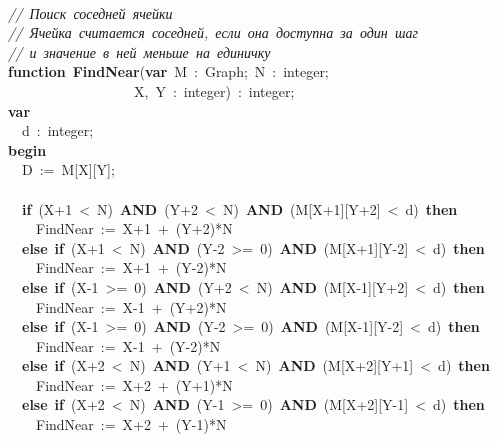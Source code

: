 \mbox{} \\
\mbox{}\textit{//\ Поиск\ соседней\ ячейки} \\
\mbox{}\textit{//\ Ячейка\ считается\ соседней,\ если\ она\ доступна\ за\ один\ шаг} \\
\mbox{}\textit{//\ и\ значение\ в\ ней\ меньше\ на\ единичку} \\
\mbox{}\textbf{function}\ \textbf{FindNear}(\textbf{var}\ M\ :\ Graph;\ N\ :\ integer; \\
\mbox{}\ \ \ \ \ \ \ \ \ \ \ \ \ \ \ \ \ \ X,\ Y\ :\ integer)\ :\ integer; \\
\mbox{}\textbf{var} \\
\mbox{}\ \ d\ :\ integer; \\
\mbox{}\textbf{begin} \\
\mbox{}\ \ D\ :=\ M[X][Y]; \\
\mbox{} \\
\mbox{}\ \ \textbf{if}\ (X+1\ \textless{}\ N)\ \textbf{AND}\ (Y+2\ \textless{}\ N)\ \textbf{AND}\ (M[X+1][Y+2]\ \textless{}\ d)\ \textbf{then} \\
\mbox{}\ \ \ \ FindNear\ :=\ X+1\ +\ (Y+2)*N \\
\mbox{}\ \ \textbf{else}\ \textbf{if}\ (X+1\ \textless{}\ N)\ \textbf{AND}\ (Y-2\ \textgreater{}=\ 0)\ \textbf{AND}\ (M[X+1][Y-2]\ \textless{}\ d)\ \textbf{then} \\
\mbox{}\ \ \ \ FindNear\ :=\ X+1\ +\ (Y-2)*N \\
\mbox{}\ \ \textbf{else}\ \textbf{if}\ (X-1\ \textgreater{}=\ 0)\ \textbf{AND}\ (Y+2\ \textless{}\ N)\ \textbf{AND}\ (M[X-1][Y+2]\ \textless{}\ d)\ \textbf{then} \\
\mbox{}\ \ \ \ FindNear\ :=\ X-1\ +\ (Y+2)*N \\
\mbox{}\ \ \textbf{else}\ \textbf{if}\ (X-1\ \textgreater{}=\ 0)\ \textbf{AND}\ (Y-2\ \textgreater{}=\ 0)\ \textbf{AND}\ (M[X-1][Y-2]\ \textless{}\ d)\ \textbf{then} \\
\mbox{}\ \ \ \ FindNear\ :=\ X-1\ +\ (Y-2)*N \\
\mbox{}\ \ \textbf{else}\ \textbf{if}\ (X+2\ \textless{}\ N)\ \textbf{AND}\ (Y+1\ \textless{}\ N)\ \textbf{AND}\ (M[X+2][Y+1]\ \textless{}\ d)\ \textbf{then} \\
\mbox{}\ \ \ \ FindNear\ :=\ X+2\ +\ (Y+1)*N \\
\mbox{}\ \ \textbf{else}\ \textbf{if}\ (X+2\ \textless{}\ N)\ \textbf{AND}\ (Y-1\ \textgreater{}=\ 0)\ \textbf{AND}\ (M[X+2][Y-1]\ \textless{}\ d)\ \textbf{then} \\
\mbox{}\ \ \ \ FindNear\ :=\ X+2\ +\ (Y-1)*N \\
